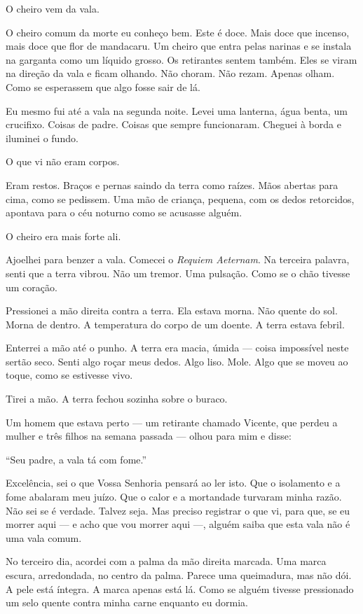 \noindent O cheiro vem da vala.

\noindent O cheiro comum da morte eu conheço bem. Este é doce. Mais doce que incenso, mais doce que flor de mandacaru. Um cheiro que entra pelas narinas e se instala na garganta como um líquido grosso. Os retirantes sentem também. Eles se viram na direção da vala e ficam olhando. Não choram. Não rezam. Apenas olham. Como se esperassem que algo fosse sair de lá.

\noindent Eu mesmo fui até a vala na segunda noite. Levei uma lanterna, água benta, um crucifixo. Coisas de padre. Coisas que sempre funcionaram. Cheguei à borda e iluminei o fundo.

\noindent O que vi não eram corpos.

\noindent Eram restos. Braços e pernas saindo da terra como raízes. Mãos abertas para cima, como se pedissem. Uma mão de criança, pequena, com os dedos retorcidos, apontava para o céu noturno como se acusasse alguém.

\noindent O cheiro era mais forte ali.

\noindent Ajoelhei para benzer a vala. Comecei o \textit{Requiem Aeternam}. Na terceira palavra, senti que a terra vibrou. Não um tremor. Uma pulsação. Como se o chão tivesse um coração.

\noindent Pressionei a mão direita contra a terra. Ela estava morna. Não quente do sol. Morna de dentro. A temperatura do corpo de um doente. A terra estava febril.

\noindent Enterrei a mão até o punho. A terra era macia, úmida --- coisa impossível neste sertão seco. Senti algo roçar meus dedos. Algo liso. Mole. Algo que se moveu ao toque, como se estivesse vivo.

\noindent Tirei a mão. A terra fechou sozinha sobre o buraco.

\noindent Um homem que estava perto --- um retirante chamado Vicente, que perdeu a mulher e três filhos na semana passada --- olhou para mim e disse:

\noindent ``Seu padre, a vala tá com fome.''

\noindent Excelência, sei o que Vossa Senhoria pensará ao ler isto. Que o isolamento e a fome abalaram meu juízo. Que o calor e a mortandade turvaram minha razão. Não sei se é verdade. Talvez seja. Mas preciso registrar o que vi, para que, se eu morrer aqui --- e acho que vou morrer aqui ---, alguém saiba que esta vala não é uma vala comum.

\noindent No terceiro dia, acordei com a palma da mão direita marcada. Uma marca escura, arredondada, no centro da palma. Parece uma queimadura, mas não dói. A pele está íntegra. A marca apenas está lá. Como se alguém tivesse pressionado um selo quente contra minha carne enquanto eu dormia.

